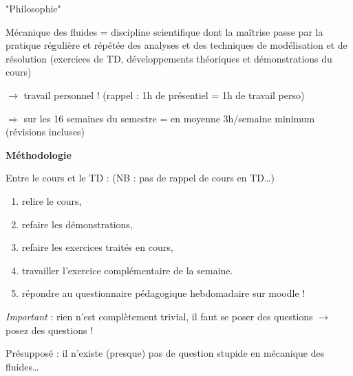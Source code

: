 \begin{frame}{"Philosophie"}

\small

Mécanique des fluides = discipline scientifique dont la maîtrise passe par la pratique régulière et
 répétée des analyses et des techniques de modélisation et de résolution 
 (exercices de TD, développements théoriques et démonstrations du cours)

\bigskip

\qquad $\rightarrow$ \textcolor{rouge}{travail personnel !} \quad (rappel : 1h de présentiel = 1h de travail perso)

\medskip
\qquad $\Rightarrow$ sur les 16 semaines du semestre = en moyenne 3h/semaine minimum (révisions incluses)

\vspace{5mm}
\pause

\textbf{Méthodologie}

\medskip
Entre le cours et le TD : \hfill (NB : pas de rappel de cours en TD\ldots)
\begin{enumerate}
\item relire le cours, 
\item refaire les démonstrations,
\item refaire les exercices traités en cours,
\item travailler l'exercice complémentaire de la semaine.
\item répondre au questionnaire pédagogique hebdomadaire sur moodle !
\end{enumerate}

\vspace{5mm}
\pause

\textsl{Important} : rien n'est complètement trivial, il faut \textcolor{rouge}{se} poser des questions 
$\rightarrow$ \textcolor{rouge}{posez des questions !}

\medskip
Présupposé : il n'existe (presque) pas de question stupide en mécanique des fluides\ldots

\vspace{10mm}

\end{frame}

